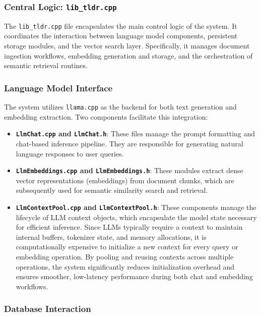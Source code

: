 \subsubsection{Central Logic: \texttt{lib\_tldr.cpp}}

The \texttt{lib\_tldr.cpp} file encapsulates the main control logic of the system. It coordinates the interaction between language model components, persistent storage modules, and the vector search layer. Specifically, it manages document ingestion workflows, embedding generation and storage, and the orchestration of semantic retrieval routines.

\subsubsection{Language Model Interface}

The system utilizes \texttt{llama.cpp} as the backend for both text generation and embedding extraction. Two components facilitate this integration:

\begin{itemize}
    \item \textbf{\texttt{LlmChat.cpp} and \texttt{LlmChat.h}}: These files manage the prompt formatting and chat-based inference pipeline. They are responsible for generating natural language responses to user queries.
    \item \textbf{\texttt{LlmEmbeddings.cpp} and \texttt{LlmEmbeddings.h}}: These modules extract dense vector representations (embeddings) from document chunks, which are subsequently used for semantic similarity search and retrieval.
    
    \item \textbf{\texttt{LlmContextPool.cpp} and \texttt{LlmContextPool.h}}: These components manage the lifecycle of LLM context objects, which encapsulate the model state necessary for efficient inference. Since LLMs typically require a context to maintain internal buffers, tokenizer state, and memory allocations, it is computationally expensive to initialize a new context for every query or embedding operation. By pooling and reusing contexts across multiple operations, the system significantly reduces initialization overhead and ensures smoother, low-latency performance during both chat and embedding workflows.
\end{itemize}

\subsubsection{Database Interaction}

